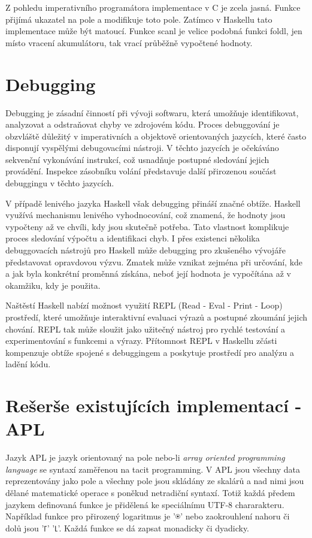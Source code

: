 \documentclass[male,czech]{kithesis}
\begin{document}
Z pohledu imperativního programátora implementace v C je zcela jasná. Funkce přijímá ukazatel na
pole a modifikuje toto pole. Zatímco v Haskellu tato implementace může být matoucí. Funkce scanl je 
velice podobná funkci foldl, jen místo vracení akumulátoru, tak vrací průběžně vypočtené hodnoty.

\section{Debugging}

Debugging je zásadní činností při vývoji softwaru, která umožňuje identifikovat, 
analyzovat a odstraňovat chyby ve zdrojovém kódu. 
Proces debuggování je obzvláště důležitý v imperativních a objektově orientovaných jazycích, 
které často disponují vyspělými debugovacími nástroji. 
V těchto jazycích je očekáváno sekvenční vykonávání instrukcí, 
což usnadňuje postupné sledování jejich provádění. 
Inspekce zásobníku volání představuje 
další přirozenou součást debuggingu v těchto jazycích.

V případě lenivého jazyka Haskell však debugging přináší značné obtíže. 
Haskell využívá mechanismu lenivého vyhodnocování, což znamená, 
že hodnoty jsou vypočteny až ve chvíli, kdy jsou skutečně potřeba. 
Tato vlastnost komplikuje proces sledování výpočtu a identifikaci chyb. 
I přes existenci několika debuggovacích nástrojů pro Haskell může 
debugging pro zkušeného vývojáře představovat opravdovou výzvu. 
Zmatek může vznikat zejména při určování, 
kde a jak byla konkrétní proměnná získána, 
neboť její hodnota je vypočítána až v okamžiku, 
kdy je použita.
\pagebreak

Naštěstí Haskell nabízí možnost využití REPL 
(Read - Eval - Print - Loop) prostředí, 
které umožňuje interaktivní evaluaci výrazů a postupné zkoumání jejich chování. 
REPL tak může sloužit jako užitečný nástroj pro rychlé testování 
a experimentování s funkcemi a výrazy. 
Přítomnost REPL v Haskellu zčásti kompenzuje obtíže spojené 
s debuggingem a poskytuje prostředí pro analýzu a ladění kódu.

\section{Rešerše existujících implementací - APL}

Jazyk APL je jazyk orientovaný na pole nebo-li \textit{array oriented programming language} se 
syntaxí zaměřenou na tacit programming. V APL jsou všechny data reprezentovány jako pole 
a všechny pole jsou skládány ze skalárů a nad 
nimi jsou dělané matematické operace s poněkud netradiční syntaxí. Totiž každá 
předem jazykem definovaná funkce je přidělená ke speciálnímu UTF-8 chararakteru. 
Například funkce pro přirozený logaritmus je {\apl '⍟'} nebo zaokrouhlení nahoru či dolů 
jsou {\apl '⌈' '⌊'}.
Každá funkce se dá zapsat monadicky či dyadicky. 
\end{document}
